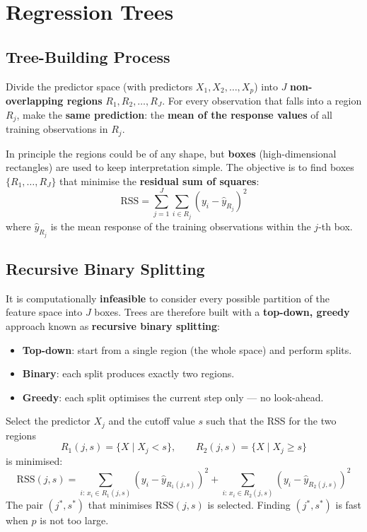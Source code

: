 \documentclass[11pt,a4paper]{article}
\theoremstyle{definition}
\theoremstyle{plain}
\theoremstyle{remark}
\begin{document}
\section{Regression Trees}

\subsection{Tree-Building Process}

\begin{tcolorbox}[colback=blue!5!white,colframe=blue!75!black,title=\textbf{Goal of Regression Trees}]
Divide the predictor space (with predictors $X_1, X_2, \ldots, X_p$) into $J$ \textbf{non-overlapping regions} $R_1, R_2, \ldots, R_J$. For every observation that falls into a region $R_j$, make the \textbf{same prediction}: the \textbf{mean of the response values} of all training observations in $R_j$.
\end{tcolorbox}

In principle the regions could be of any shape, but \textbf{boxes} (high-dimensional rectangles) are used to keep interpretation simple. The objective is to find boxes $\{R_1, \ldots, R_J\}$ that minimise the \textbf{residual sum of squares}:
\[
    \mathrm{RSS} = \sum_{j=1}^{J} \sum_{i \in R_j} (y_i - \hat{y}_{R_j})^2
\]
where $\hat{y}_{R_j}$ is the mean response of the training observations within the $j$-th box.

\subsection{Recursive Binary Splitting}

It is computationally \textbf{infeasible} to consider every possible partition of the feature space into $J$ boxes. Trees are therefore built with a \textbf{top-down, greedy} approach known as \textbf{recursive binary splitting}:
\begin{itemize}
    \item \textbf{Top-down}: start from a single region (the whole space) and perform splits.
    \item \textbf{Binary}: each split produces exactly two regions.
    \item \textbf{Greedy}: each split optimises the current step only — no look-ahead.
\end{itemize}

\begin{tcolorbox}[colback=blue!5!white,colframe=blue!75!black,title=\textbf{Recursive Binary Splitting Step}]
Select the predictor $X_j$ and the cutoff value $s$ such that the RSS for the two regions
\[
    R_1(j, s) = \{X \mid X_j < s\}, \qquad R_2(j, s) = \{X \mid X_j \geq s\}
\]
is minimised:
\[
    \mathrm{RSS}(j, s) = \sum_{i:\, x_i \in R_1(j, s)} (y_i - \hat{y}_{R_1(j, s)})^2 + \sum_{i:\, x_i \in R_2(j, s)} (y_i - \hat{y}_{R_2(j, s)})^2
\]
The pair $(j^*, s^*)$ that minimises $\mathrm{RSS}(j, s)$ is selected. Finding $(j^*, s^*)$ is fast when $p$ is not too large.
\end{tcolorbox}
\end{document}
